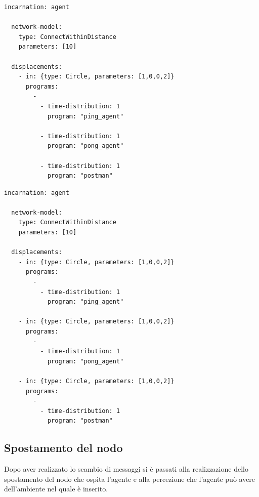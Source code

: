 \documentclass[12pt,a4paper,openright,twoside]{report}
\begin{document}
\medskip
\begin{lstlisting}[firstnumber=1,label={lst:SimulazioneStessoNodo},caption={Simulazione con agenti sullo stesso nodo}]
  incarnation: agent

  network-model:
    type: ConnectWithinDistance
    parameters: [10]

  displacements:
    - in: {type: Circle, parameters: [1,0,0,2]}
      programs:
        -
          - time-distribution: 1
            program: "ping_agent"

          - time-distribution: 1
            program: "pong_agent"

          - time-distribution: 1
            program: "postman"
\end{lstlisting}

\begin{lstlisting}[firstnumber=1,label={lst:SimulazioneNodiDiversi},caption={Simulazione con agenti su nodi diversi}]
  incarnation: agent

  network-model:
    type: ConnectWithinDistance
    parameters: [10]

  displacements:
    - in: {type: Circle, parameters: [1,0,0,2]}
      programs:
        -
          - time-distribution: 1
            program: "ping_agent"

    - in: {type: Circle, parameters: [1,0,0,2]}
      programs:
        -
          - time-distribution: 1
            program: "pong_agent"

    - in: {type: Circle, parameters: [1,0,0,2]}
      programs:
        -
          - time-distribution: 1
            program: "postman"
\end{lstlisting}


\subsection{Spostamento del nodo}
Dopo aver realizzato lo scambio di messaggi si \`e passati alla realizzazione dello spostamento del nodo che ospita l'agente e alla percezione che l'agente pu\`o avere dell'ambiente nel quale \`e inserito.
\end{document}
